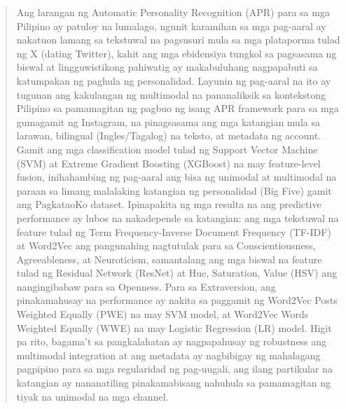 %
%
%                 

\begin{abstract}


Ang larangan ng Automatic Personality Recognition (APR) para sa mga Pilipino ay patuloy na lumalago, ngunit karamihan sa mga pag-aaral ay nakatuon lamang sa tekstuwal na pagsusuri mula sa mga plataporma tulad ng X (dating Twitter), kahit ang mga ebidensiya tungkol sa pagsasama ng biswal at lingguwistikong pahiwatig ay makabuluhang nagpapabuti sa katumpakan ng paghula ng personalidad. Layunin ng pag-aaral na ito ay tugunan ang kakulangan ng multimodal na pananaliksik sa kontekstong Pilipino sa pamamagitan ng pagbuo ng isang APR framework para sa mga gumagamit ng Instagram, na pinagsasama ang mga katangian mula sa larawan, bilingual (Ingles/Tagalog) na teksto, at metadata ng account. Gamit ang mga classification model tulad ng Support Vector Machine (SVM) at Extreme Gradient Boosting (XGBoost) na may feature-level fusion, inihahambing ng pag-aaral ang bisa ng unimodal at multimodal na paraan sa limang malalaking katangian ng personalidad (Big Five) gamit ang PagkataoKo dataset. Ipinapakita ng mga resulta na ang predictive performance ay lubos na nakadepende sa katangian: ang mga tekstuwal na feature tulad ng Term Frequency-Inverse Document Frequency (TF-IDF) at Word2Vec ang pangunahing nagtutulak para sa Conscientiousness, Agreeableness, at Neuroticism, samantalang ang mga biswal na feature tulad ng Residual Network (ResNet) at Hue, Saturation, Value (HSV) ang nangingibabaw para sa Openness. Para sa Extraversion, ang pinakamahusay na performance ay nakita sa paggamit ng Word2Vec Posts Weighted Equally (PWE) na may SVM model, at Word2Vec Words Weighted Equally (WWE) na may Logistic Regression (LR) model. Higit pa rito, bagama't sa pangkalahatan ay nagpapahusay ng robustness ang multimodal integration at ang metadata ay nagbibigay ng mahalagang pagpipino para sa mga regularidad ng pag-uugali, ang ilang partikular na katangian ay nananatiling pinakamabisang nahuhula sa pamamagitan ng tiyak na unimodal na mga channel.


%
%
\end{abstract}

